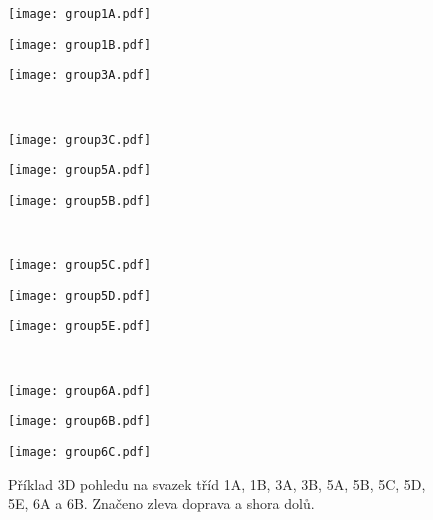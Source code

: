 \begin{figure}[htps]
\centering
\begin{minipage}[c]{0.325\textwidth}
\texttt{[image: group1A.pdf]}
\end{minipage}
\begin{minipage}[c]{0.325\textwidth}
\texttt{[image: group1B.pdf]}
\end{minipage}
\begin{minipage}[c]{0.325\textwidth}
\texttt{[image: group3A.pdf]}
\end{minipage}\\

\begin{minipage}[c]{0.325\textwidth}
\texttt{[image: group3C.pdf]}
\end{minipage}
\begin{minipage}[c]{0.325\textwidth}
\texttt{[image: group5A.pdf]}
\end{minipage}
\begin{minipage}[c]{0.325\textwidth}
\texttt{[image: group5B.pdf]}
\end{minipage}\\

\begin{minipage}[c]{0.325\textwidth}
\texttt{[image: group5C.pdf]}
\end{minipage}
\begin{minipage}[c]{0.325\textwidth}
\texttt{[image: group5D.pdf]}
\end{minipage}
\begin{minipage}[c]{0.325\textwidth}
\texttt{[image: group5E.pdf]}
\end{minipage}\\

\begin{minipage}[c]{0.325\textwidth}
\texttt{[image: group6A.pdf]}
\end{minipage}
\begin{minipage}[c]{0.325\textwidth}
\texttt{[image: group6B.pdf]}
\end{minipage}
\begin{minipage}[c]{0.325\textwidth}
\texttt{[image: group6C.pdf]}
\end{minipage}

\caption{Příklad 3D pohledu na svazek tříd 1A, 1B, 3A, 3B, 5A, 5B, 5C, 5D, 5E, 6A a 6B. Značeno zleva doprava a shora dolů.}
\label{fig:modelClass3D2}
\end{figure}




